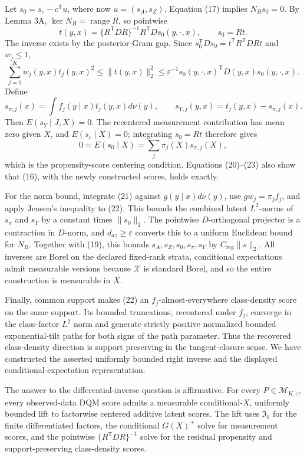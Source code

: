 Let \(s_0=s_c-c^{\mathsf T}u\), where now \(u=(s_A,s_Z)\).  Equation (17) implies \(N_Bs_0=0\).  By Lemma 3A, \(\ker N_B=\operatorname{range}R\), so pointwise
\[
t(y,x)=\{R^{\mathsf T}DR\}^{-1}R^{\mathsf T}D
s_0(y,\cdot,x),\qquad s_0=Rt. \tag{20}
\]
The inverse exists by the posterior-Gram gap.  Since \(s_0^{\mathsf T}Ds_0=t^{\mathsf T}R^{\mathsf T}DRt\) and \(w_j\leq1\),
\[
\sum_{j=1}^Kw_j(y,x)t_j(y,x)^2
\leq\|t(y,x)\|_2^2
\leq\varepsilon^{-1}s_0(y,\cdot,x)^{\mathsf T}D(y,x)s_0(y,\cdot,x). \tag{21}
\]
Define
\[
s_{\pi,j}(x)=\int f_j(y\mid x)t_j(y,x)d\nu(y),\qquad
s_{Y,j}(y,x)=t_j(y,x)-s_{\pi,j}(x). \tag{22}
\]
Then \(E(s_Y\mid J,X)=0\).  The recentered measurement contribution has mean zero given \(X\), and \(E(s_c\mid X)=0\); integrating \(s_0=Rt\) therefore gives
\[
0=E(s_0\mid X)=\sum_j\pi_j(X)s_{\pi,j}(X), \tag{23}
\]
which is the propensity-score centering condition.  Equations (20)--(23) also show that (16), with the newly constructed scores, holds exactly.

For the norm bound, integrate (21) against \(g(y\mid x)d\nu(y)\), use \(g w_j=\pi_jf_j\), and apply Jensen's inequality to (22).  This bounds the combined latent \(L^2\)-norms of \(s_\pi\) and \(s_Y\) by a constant times \(\|s_0\|_2\).  The pointwise \(D\)-orthogonal projector is a contraction in \(D\)-norm, and \(d_{az}\geq\varepsilon\) converts this to a uniform Euclidean bound for \(N_B\).  Together with (19), this bounds \(s_A,s_Z,s_0,s_\pi,s_Y\) by \(C_{\mathrm{reg}}\|s\|_2\).  All inverses are Borel on the declared fixed-rank strata, conditional expectations admit measurable versions because \(\mathcal X\) is standard Borel, and so the entire construction is measurable in \(X\).

Finally, common support makes (22) an \(f_j\)-almost-everywhere class-density score on the same support.  Its bounded truncations, recentered under \(f_j\), converge in the class-factor \(L^2\) norm and generate strictly positive normalized bounded exponential-tilt paths for both signs of the path parameter.  Thus the recovered class-density direction is support preserving in the tangent-closure sense.  We have constructed the asserted uniformly bounded right inverse and the displayed conditional-expectation representation.

The answer to the differential-inverse question is affirmative.  For every \(P\in\mathcal M_{K,\varepsilon}\), every observed-data DQM score admits a measurable conditional-\(X\), uniformly bounded lift to factorwise centered additive latent scores.  The lift uses \(\mathfrak I_0\) for the finite differentiated factors, the conditional \(G(X)^+\) solve for measurement scores, and the pointwise \(\{R^{\mathsf T}DR\}^{-1}\) solve for the residual propensity and support-preserving class-density scores.


